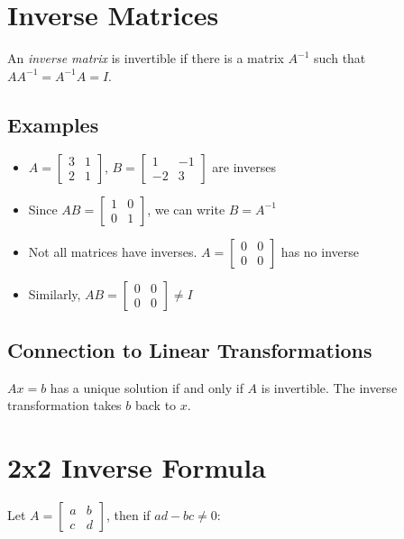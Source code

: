 \documentclass[12pt,a4paper]{article}
\begin{document}
\section{Inverse Matrices}

An \textit{inverse matrix} is invertible if there is a matrix $A^{-1}$ such that $AA^{-1} = A^{-1}A = I$.

\subsection{Examples}

\begin{itemize}
    \item $A = \begin{bmatrix} 3 & 1 \\ 2 & 1 \end{bmatrix}$, $B = \begin{bmatrix} 1 & -1 \\ -2 & 3 \end{bmatrix}$ are inverses
    \item Since $AB = \begin{bmatrix} 1 & 0 \\ 0 & 1 \end{bmatrix}$, we can write $B = A^{-1}$
    \item Not all matrices have inverses. $A = \begin{bmatrix} 0 & 0 \\ 0 & 0 \end{bmatrix}$ has no inverse
    \item Similarly, $AB = \begin{bmatrix} 0 & 0 \\ 0 & 0 \end{bmatrix} \neq I$
\end{itemize}

\subsection{Connection to Linear Transformations}

$Ax = b$ has a unique solution if and only if $A$ is invertible. The inverse transformation takes $b$ back to $x$.

\section{2x2 Inverse Formula}

Let $A = \begin{bmatrix} a & b \\ c & d \end{bmatrix}$, then if $ad-bc \neq 0$:
\end{document}

